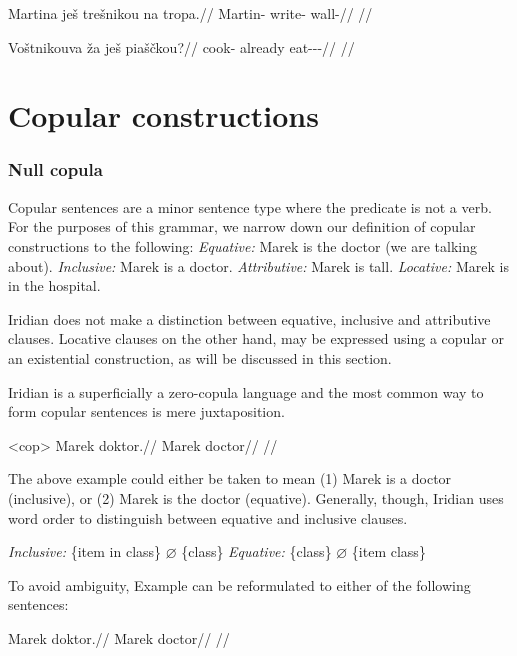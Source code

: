 \pex
\begingl
\gla Martina ješ trešnikou na tropa.//
\glb Martin-\Acc{} \Exst{} write- \Loc{} wall-\Acc{}//
\glft {}//
\endgl
\xe

\pex
\begingl
\gla Voštnikouva ža ješ piaščkou?//
\glb cook- already \Exst{} eat-\Av{}-\Pf{}-\Nz{}//
\glft {}//
\endgl
\xe

\section{Copular constructions}
\subsubsection{Null copula}

Copular sentences are a minor sentence type where the predicate is not a verb.
For the purposes of this grammar, we narrow down our definition of copular
constructions to the following:
\pex
\a \textit{Equative:} Marek is the doctor (we are talking about).
\a \textit{Inclusive:} Marek is a doctor.
\a \textit{Attributive:} Marek is tall.
\a \textit{Locative:} Marek is in the hospital.
\xe

Iridian does not make a distinction between equative, inclusive and attributive
clauses. Locative clauses on the other hand, may be expressed using a copular or
an existential construction, as will be discussed in this section.

Iridian is a superficially a zero-copula language and the most common way to
form copular sentences is mere juxtaposition.

\pex<cop>
\begingl
\gla Marek doktor.//
\glb Marek doctor//
\glft {}//
\endgl
\xe

The above example could either be taken to mean (1) Marek is a doctor
(inclusive), or (2) Marek is the doctor (equative). Generally, though, Iridian
uses word order to distinguish between equative and inclusive clauses.

\pex
\a \textit{Inclusive:} \{item in class\} $\varnothing$ \{class\}
\a \textit{Equative:} \{class\} $\varnothing$ \{item class\}
\xe

To avoid ambiguity, Example  can be reformulated to either of the
following sentences:

\a
\begingl
\gla Marek doktor.//
\glb Marek doctor//
\glft {}//
\endgl

